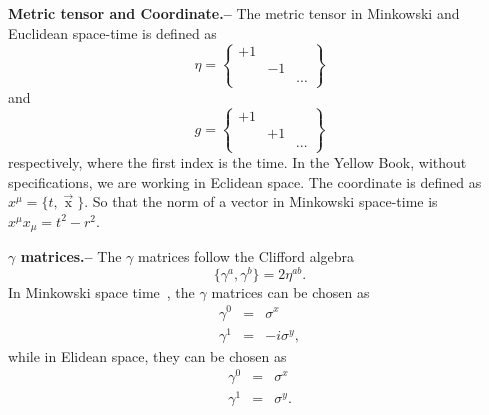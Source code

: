 \documentclass[submission, PhysLectNotes]{SciPost}
\begin{document}
{\bf Metric tensor and Coordinate.--}  The metric tensor in Minkowski and Euclidean space-time is defined as
\begin{equation}
    \eta = \begin{Bmatrix}
        +1 &   &\\
           & -1& \\
           &   & \cdots
    \end{Bmatrix}
\end{equation}
and
\begin{equation}
    g = \begin{Bmatrix}
        +1 &   &\\
           & +1& \\
           &   & \cdots
    \end{Bmatrix}
\end{equation}
respectively, where the first index is the time. In the Yellow Book, without specifications, we are working in Eclidean space. The coordinate is defined as $x^\mu = \{t, \mathop{x}\limits^\rightarrow\}$. So that the norm of a vector in Minkowski space-time is $x^\mu x_\mu = t^2 - r^2$.

{\bf $\gamma$ matrices.--}   The $\gamma$ matrices follow the Clifford algebra
\begin{equation}
    \{\gamma^a,\gamma^b\} = 2\eta^{ab}.
\end{equation}
In Minkowski space time , the $\gamma$ matrices can be chosen as
\begin{eqnarray}
    \gamma^0 &=& \sigma^x \nonumber \\
    \gamma^1 &=&  -i\sigma^y,
\end{eqnarray}
while in Elidean space, they can be chosen as
\begin{eqnarray}
    \gamma^0 &=& \sigma^x \nonumber \\
    \gamma^1 &=& \sigma^y.
\end{eqnarray}
\end{document}
